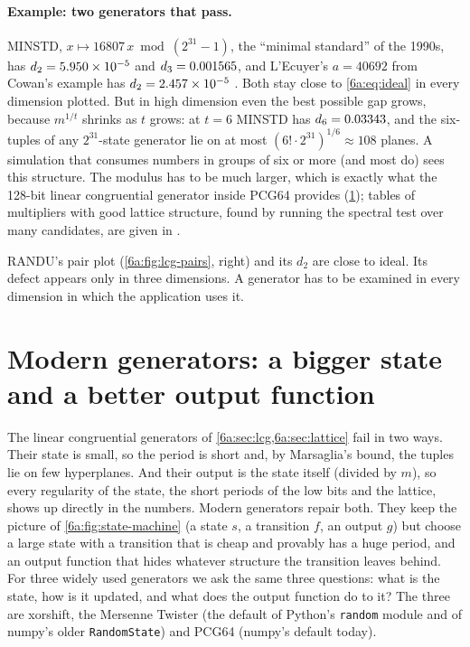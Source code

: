 \paragraph{Example: two generators that pass.}
MINSTD, $x\mapsto16807\,x\bmod(2^{31}-1)$, the ``minimal standard'' of the 1990s,
has $d_2=5.950\times10^{-5}$ and $d_3=0.001565$, and L'Ecuyer's
$a=40692$ from Cowan's example has $d_2=2.457\times10^{-5}$
. Both stay close to \eqref{6a:eq:ideal} in every dimension
plotted. But in high dimension even the best possible gap grows, because $m^{1/t}$ shrinks as $t$ grows: at $t=6$ MINSTD has
$d_6=0.03343$, and the six-tuples of any $2^{31}$-state generator lie on
at most $(6!\cdot2^{31})^{1/6}\approx 108$ planes. A simulation that consumes
numbers in groups of six or more (and most do) sees this structure. The modulus
has to be much larger, which is exactly what the 128-bit linear congruential
generator inside PCG64 provides (\cref{6a:sec:modern}); tables of multipliers with
good lattice structure, found by running the spectral test over many candidates, are
given in \cite{LEcuyer1999}.

\begin{pitfall}
RANDU's pair plot (\cref{6a:fig:lcg-pairs}, right) and its $d_2$ are close to
ideal. Its defect appears only in three dimensions. A generator has to be examined
in every dimension in which the application uses it.
\end{pitfall}
\section{Modern generators: a bigger state and a better output function}
\label{6a:sec:modern}

The linear congruential generators of \cref{6a:sec:lcg,6a:sec:lattice} fail in two
ways. Their state is small, so the period is short and, by Marsaglia's bound, the
tuples lie on few hyperplanes. And their output is the state itself (divided by
$m$), so every regularity of the state, the short periods of the low bits and the
lattice, shows up directly in the numbers. Modern generators repair both. They
keep the picture of \cref{6a:fig:state-machine} (a state $s$, a transition $f$, an
output $g$) but choose a large state with a transition that is cheap and provably
has a huge period, and an output function that hides whatever structure the
transition leaves behind. For three widely used generators we ask the same
three questions: what is the state, how is it updated, and what does the output
function do to it? The three are xorshift, the Mersenne Twister (the default of Python's \texttt{random} module and of numpy's
older \texttt{RandomState}) and PCG64 (numpy's default today).

